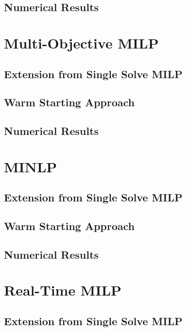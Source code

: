 \documentclass[10pt]{article}
\begin{document}
	\subsection{Numerical Results}
	
	\section{Multi-Objective MILP}\label{s:mom}
	
	\subsection{Extension from Single Solve MILP}
	
	\subsection{Warm Starting Approach}
	
	\subsection{Numerical Results}
	
	\section{MINLP}\label{s:minlp}
	
	\subsection{Extension from Single Solve MILP}
	
	\subsection{Warm Starting Approach}
	
	\subsection{Numerical Results}
	
	\section{Real-Time MILP}\label{s:rt}
	
	\subsection{Extension from Single Solve MILP}
	
\end{document}
